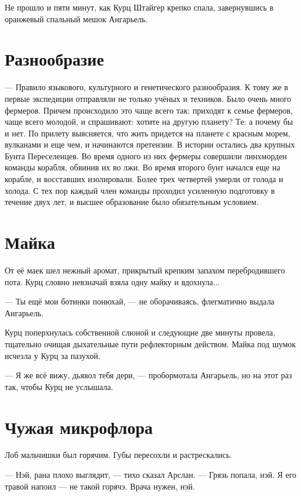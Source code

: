 Не прошло и пяти минут, как Курц Штайгер крепко спала, завернувшись в оранжевый спальный мешок Ангарьель.

\section{Разнообразие}

--- Правило языкового, культурного и генетического разнообразия.
К тому же в первые экспедиции отправляли не только учёных и техников.
Было очень много фермеров.
Причем происходило это чаще всего так: приходят к семье фермеров, чаще всего молодой, и спрашивают: хотите на другую планету?
Те: а почему бы и нет.
По прилету выясняется, что жить придется на планете с красным морем, вулканами и еще чем,  и начинаются претензии.
В истории остались два крупных Бунта Переселенцев.
Во время одного из них фермеры совершили линхморден команды корабля, обвинив их во лжи.
Во время второго бунт начался еще на корабле, и восставших изолировали.
Более трех четвертей умерли от голода и холода.
С тех пор каждый член команды проходил усиленную подготовку в течение двух лет, и высшее образование было обязательным условием.

\section{Майка}

От её маек шел нежный аромат, прикрытый крепким запахом перебродившего пота.
Курц словно невзначай взяла одну майку и вдохнула...

--- Ты ещё мои ботинки понюхай, --- не оборачиваясь, флегматично выдала Ангарьель.

Курц поперхнулась собственной слюной и следующие две минуты провела, тщательно очищая дыхательные пути рефлекторным действом.
Майка под шумок исчезла у Курц за пазухой.

--- Я же всё вижу, дьявол тебя дери, --- пробормотала Ангарьель, но на этот раз так, чтобы Курц не услышала.

\section{Чужая микрофлора}

Лоб мальчишки был горячим.
Губы пересохли и растрескались.

--- Нэй, рана плохо выглядит, --- тихо сказал Арслан.
--- Грязь попала, нэй.
Я его травой напоил --- не такой горячэ.
Врача нужен, нэй.

